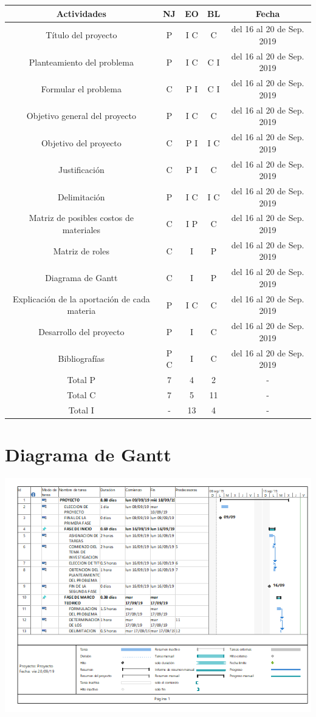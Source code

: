 \documentclass[12pt,a4paper]{article}
\begin{document}
\begin{tabular}{|c|c|c|c|c|}
\hline 
Actividades  & NJ & EO & BL & Fecha  \\ 
\hline 
Título del proyecto  & P & I C & C & del 16 al 20 de Sep. 2019 \\ 
\hline 
Planteamiento del problema  & P & I C & C I & del 16 al 20 de Sep. 2019 \\ 
\hline 
Formular el problema  & C & P I & C I & del 16 al 20 de Sep. 2019 \\ 
\hline 
Objetivo general del proyecto  & P & I C & C & del 16 al 20 de Sep. 2019 \\ 
\hline 
Objetivo del proyecto  & C & P I & I C  & del 16 al 20 de Sep. 2019 \\ 
\hline 
Justificación  & C & P I & C & del 16 al 20 de Sep. 2019 \\ 
\hline 
Delimitación & P & I C & I C & del 16 al 20 de Sep. 2019 \\ 
\hline 
Matriz de posibles costos de materiales  & C & I P  & C & del 16 al 20 de Sep. 2019 \\ 
\hline 
Matriz de roles  & C & I & P & del 16 al 20 de Sep. 2019 \\ 
\hline 
Diagrama de Gantt  & C & I & P & del 16 al 20 de Sep. 2019 \\ 
\hline 
Explicación de la aportación de cada materia  & P & I C & C & del 16 al 20 de Sep. 2019 \\ 
\hline 
Desarrollo del proyecto  & P & I & C & del 16 al 20 de Sep. 2019 \\ 
\hline 
Bibliografías  & P C & I & C & del 16 al 20 de Sep. 2019 \\ 
\hline 
Total P & 7 & 4 & 2 & - \\ 
\hline 
Total C & 7 & 5 & 11 & - \\ 
\hline 
Total I & - & 13 & 4 & - \\ 
\hline 
\end{tabular}

\section{Diagrama de Gantt}
\includegraphics[width=18cm]{Diagrama.png}
\newpage
\end{document}
